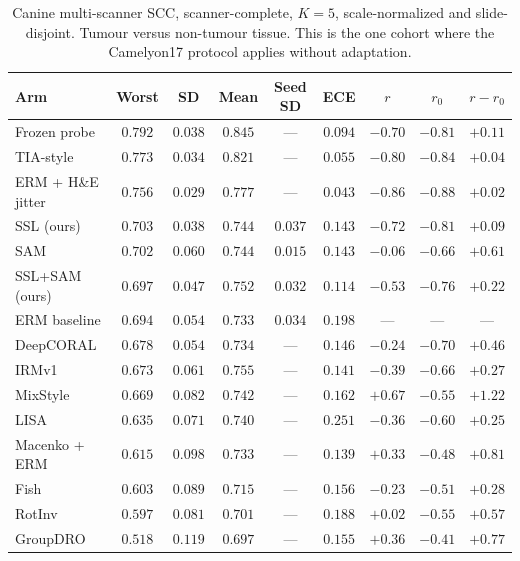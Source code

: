 \documentclass[10pt]{article} %
\begin{document}
\begin{table}[h]
\centering
\caption{Canine multi-scanner SCC, scanner-complete, $K=5$, scale-normalized
and slide-disjoint. Tumour versus non-tumour tissue. This is the one cohort
where the Camelyon17 protocol applies without adaptation.}
\label{tab:canine_full}
\small
\setlength{\tabcolsep}{4pt}
\begin{tabular}{lcccccccc}
\toprule
Arm & Worst & SD & Mean & Seed SD & ECE & $r$ & $r_0$ & $r-r_0$ \\
\midrule
Frozen probe        & $\mathbf{0.792}$ & $0.038$ & $\mathbf{0.845}$ & --- & $0.094$ & $-0.70$ & $-0.81$ & $+0.11$ \\
TIA-style           & $0.773$ & $0.034$ & $0.821$ & --- & $0.055$ & $-0.80$ & $-0.84$ & $+0.04$ \\
ERM + H\&E jitter   & $0.756$ & $\mathbf{0.029}$ & $0.777$ & --- & $\mathbf{0.043}$ & $-0.86$ & $-0.88$ & $+0.02$ \\
SSL (ours)          & $0.703$ & $0.038$ & $0.744$ & $0.037$ & $0.143$ & $-0.72$ & $-0.81$ & $+0.09$ \\
SAM                 & $0.702$ & $0.060$ & $0.744$ & $\mathbf{0.015}$ & $0.143$ & $-0.06$ & $-0.66$ & $+0.61$ \\
SSL+SAM (ours)      & $0.697$ & $0.047$ & $0.752$ & $0.032$ & $0.114$ & $-0.53$ & $-0.76$ & $+0.22$ \\
ERM baseline        & $0.694$ & $0.054$ & $0.733$ & $0.034$ & $0.198$ & --- & --- & --- \\
DeepCORAL           & $0.678$ & $0.054$ & $0.734$ & --- & $0.146$ & $-0.24$ & $-0.70$ & $+0.46$ \\
IRMv1               & $0.673$ & $0.061$ & $0.755$ & --- & $0.141$ & $-0.39$ & $-0.66$ & $+0.27$ \\
MixStyle            & $0.669$ & $0.082$ & $0.742$ & --- & $0.162$ & $+0.67$ & $-0.55$ & $+1.22$ \\
LISA                & $0.635$ & $0.071$ & $0.740$ & --- & $0.251$ & $-0.36$ & $-0.60$ & $+0.25$ \\
Macenko + ERM       & $0.615$ & $0.098$ & $0.733$ & --- & $0.139$ & $+0.33$ & $-0.48$ & $+0.81$ \\
Fish                & $0.603$ & $0.089$ & $0.715$ & --- & $0.156$ & $-0.23$ & $-0.51$ & $+0.28$ \\
RotInv              & $0.597$ & $0.081$ & $0.701$ & --- & $0.188$ & $+0.02$ & $-0.55$ & $+0.57$ \\
GroupDRO            & $0.518$ & $0.119$ & $0.697$ & --- & $0.155$ & $+0.36$ & $-0.41$ & $+0.77$ \\
\bottomrule
\end{tabular}
\end{table}
\end{document}
